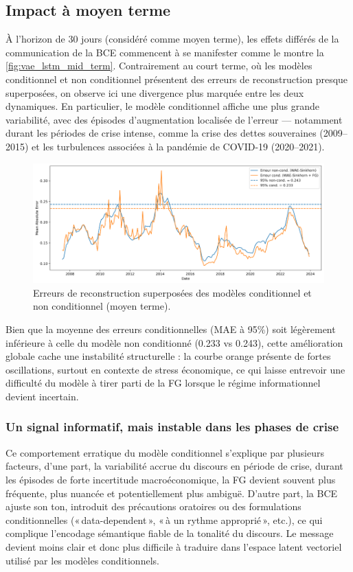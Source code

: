 \subsection{Impact à moyen terme}

À l’horizon de 30 jours (considéré comme moyen terme), les effets différés de la communication de la BCE commencent à se manifester comme le montre la \autoref{fig:vae_lstm_mid_term}. Contrairement au court terme, où les modèles conditionnel et non conditionnel présentent des erreurs de reconstruction presque superposées, on observe ici une divergence plus marquée entre les deux dynamiques. En particulier, le modèle conditionnel  affiche une plus grande variabilité, avec des épisodes d’augmentation localisée de l’erreur — notamment durant les périodes de crise intense, comme la crise des dettes souveraines (2009–2015) et les turbulences associées à la pandémie de COVID-19 (2020–2021).

\begin{figure}[H]
    \centering
    \includegraphics[width=0.9\linewidth]{images/results_mt.png}
    \caption{Erreurs de reconstruction superposées des modèles conditionnel et non conditionnel (moyen terme).}
    \label{fig:vae_lstm_mid_term}
\end{figure}

Bien que la moyenne des erreurs conditionnelles (MAE à 95\%) soit légèrement inférieure à celle du modèle non conditionné (0.233 vs 0.243), cette amélioration globale cache une instabilité structurelle : la courbe orange présente de fortes oscillations, surtout en contexte de stress économique, ce qui laisse entrevoir une difficulté du modèle à tirer parti de la FG lorsque le régime informationnel devient incertain.

\subsubsection{Un signal informatif, mais instable dans les phases de crise}

Ce comportement erratique du modèle conditionnel s’explique par plusieurs facteurs, d'une part, la variabilité accrue du discours en période de crise, durant les épisodes de forte incertitude macroéconomique, la FG devient souvent plus fréquente, plus nuancée et potentiellement plus ambiguë. D'autre part, la BCE ajuste son ton, introduit des précautions oratoires ou des formulations conditionnelles (« data-dependent », « à un rythme approprié », etc.), ce qui complique l’encodage sémantique fiable de la tonalité du discours. Le message devient moins clair et donc plus difficile à traduire dans l’espace latent vectoriel utilisé par les modèles conditionnels.\\

